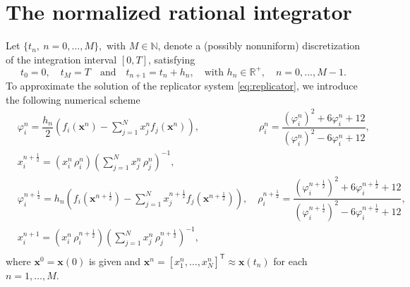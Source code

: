 \documentclass[11pt,letterpaper]{article}
\theoremstyle{remark}
\begin{document}
\section{The normalized rational integrator}\label{sec:Method}
Let $\{t_n, \ n=0,\dots,M\},$ with $M \in \mathbb{N}$, denote a (possibly nonuniform) discretization of the integration interval $[0,T]$, satisfying
\begin{equation}\label{eq:Stepsizes_variation}
    t_0 = 0,\quad t_M = T\quad \text{and} \quad t_{n+1} = t_n + h_n, \quad \text{with } h_n \in \mathbb{R}^+, \quad n = 0, \dots, M-1.
\end{equation}
To approximate the solution of the replicator system \eqref{eq:replicator}, we introduce the following numerical scheme
\begin{equation}\label{eq:Rational_Integrator}
    \begin{split}
        &\varphi_i^n=\dfrac{h_n}{2} \left( f_i(\bm{x}^n) - \sum_{j=1}^{N} x_j^n f_j(\bm{x}^n) \right), \qquad  \qquad \qquad 
        \rho_i^n =\dfrac{(\varphi_i^n)^2+6\varphi_i^n+12}{(\varphi_i^n)^2-6\varphi_i^n+12},\\
        &x_i^{n+\frac{1}{2}}= (x_i^n \, \rho_i^n)\left(\displaystyle\sum_{j=1}^N x_j^n \, \rho_j^n\right)^{-1}, \\
        &\varphi_i^{n+\frac{1}{2}}=h_n \left( f_i(\bm{x}^{n+\frac{1}{2}}) - \sum_{j=1}^{N} x_j^{n+\frac{1}{2}} f_j(\bm{x}^{n+\frac{1}{2}}) \right), \quad
        \rho_i^{n+\frac{1}{2}}=\dfrac{(\varphi_i^{n+\frac{1}{2}})^2+6\varphi_i^{n+\frac{1}{2}}+12}{(\varphi_i^{n+\frac{1}{2}})^2-6\varphi_i^{n+\frac{1}{2}}+12},\\
        &x_i^{n+1}= (x_i^{n} \, \rho_i^{n+\frac{1}{2}})\left(\displaystyle\sum_{j=1}^N x_j^{n} \, \rho_j^{n+\frac{1}{2}}\right)^{-1}, \\
    \end{split}
\end{equation}
where $\bm{x}^0=\bm{x}(0)$ is given and $\bm{x}^n = [x_1^n, \dots, x_N^n]^\mathsf{T} \approx \bm{x}(t_n)$ for each $n = 1, \dots, M$.
\end{document}
